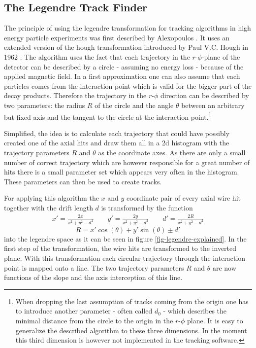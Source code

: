 \subsection{The Legendre Track Finder}
The principle of using the legendre transformation for tracking algorithms in high energy particle experiments was first described by Alexopoulos \cite{legendre}. It uses an extended version of the hough transformation introduced by Paul V.C. Hough in 1962 \cite{hough}. The algorithm uses the fact that each trajectory in the $r$-$\phi$-plane of the detector can be described by a circle - assuming no energy loss - because of the applied magnetic field. In a first approximation one can also assume that each particles comes from the interaction point which is valid for the bigger part of the decay products. Therefore the trajectory in the $r$-$\phi$ direction can be described by two parameters: the radius $R$ of the circle and the angle $\theta$ between an arbitrary but fixed axis and the tangent to the circle at the interaction point.\footnote{When dropping the last assumption of tracks coming from the origin one has to introduce another parameter - often called $d_0$ - which describes the minimal distance from the circle to the origin in the $r$-$\phi$ plane. It is easy to generalize the described algorithm to these three dimensions. In the moment this third dimension is however not implemented in the tracking software.}

Simplified, the idea is to calculate each trajectory that could have possibly created one of the axial hits and draw them all in a 2d histogram with the trajectory parameters $R$ and $\theta$ as the coordinate axes. As there are only a small number of correct trajectory which are however responsible for a great number of hits there is a small parameter set which appears very often in the histogram. These parameters can then be used to create tracks.

For applying this algorithm the $x$ and $y$ coordinate pair of every axial wire hit together with the drift length $d$ is transformed by the function
\begin{align*} x' = \frac{2x}{x^2 + y^2 - d^2} \qquad y' = \frac{2y}{x^2 + y^2 - d^2}  \qquad d' = \frac{2R}{x^2 + y^2 - d^2} \end{align*}
$$R = x' \cos(\theta) + y' \sin(\theta) \pm d'$$
into the legendre space as it can be seen in figure \ref{fig-legendre-explained}. In the first step of the transformation, the wire hits are transformed to the inverted plane. With this transformation each circular trajectory through the interaction point is mapped onto a line. The two trajectory parameters $R$ and $\theta$ are now functions of the slope and the axis interception of this line. 

